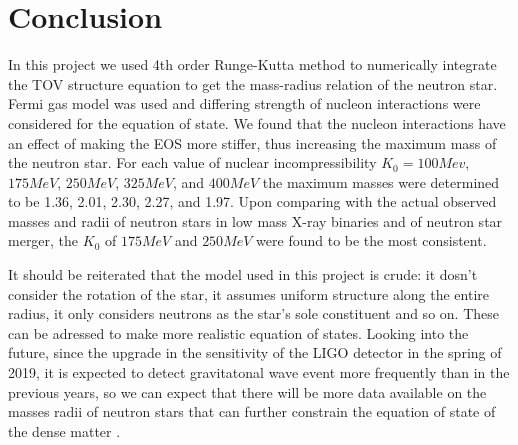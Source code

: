 \documentclass[draft,11pt]{article}
\theoremstyle{definition}
\theoremstyle{remark}
\begin{document}
    \section{Conclusion}
        In this project we used 4th order Runge-Kutta method to numerically integrate the TOV structure equation to get the mass-radius relation of the neutron star. Fermi gas model was used and differing strength of nucleon interactions were considered for the equation of state. We found that the nucleon interactions have an effect of making the EOS more stiffer, thus increasing the maximum mass of the neutron star. For each value of nuclear incompressibility $K_0=100Mev$, $175MeV$, $250MeV$, $325MeV$, and $400MeV$ the maximum masses were determined to be \SI{1.36}{\solarmass}, \SI{2.01}{\solarmass}, \SI{2.30}{\solarmass}, \SI{2.27}{\solarmass}, and \SI{1.97}{\solarmass}. Upon comparing with the actual observed masses and radii of neutron stars in low mass X-ray binaries and of neutron star merger, the $K_0$ of $175MeV$ and $250MeV$ were found to be the most consistent.
        
        It should be reiterated that the model used in this project is crude: it dosn't consider the rotation of the star, it assumes uniform structure along the entire radius, it only considers neutrons as the star's sole constituent and so on. These can be adressed to make more realistic equation of states. Looking into the future, since the upgrade in the sensitivity of the LIGO detector in the spring of 2019, it is expected to detect gravitatonal wave event more frequently than in the previous years, so we can expect that there will be more data available on the masses radii of neutron stars that can further constrain the equation of state of the dense matter \cite{ligo.update.2019}.
    
    \printbibliography
\end{document}
